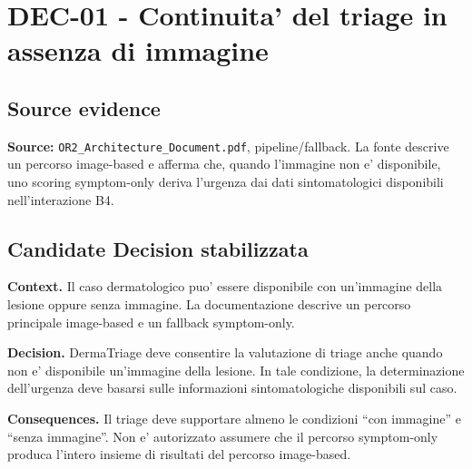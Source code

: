 \documentclass[11pt,a4paper]{article}
\begin{document}
\section{DEC-01 - Continuita' del triage in assenza di immagine}
\closedtag

\subsection{Source evidence}
\textbf{Source:} \texttt{OR2\_Architecture\_Document.pdf}, pipeline/fallback. La fonte descrive un percorso image-based e afferma che, quando l'immagine non e' disponibile, uno scoring symptom-only deriva l'urgenza dai dati sintomatologici disponibili nell'interazione B4.

\subsection{Candidate Decision stabilizzata}
\textbf{Context.} Il caso dermatologico puo' essere disponibile con un'immagine della lesione oppure senza immagine. La documentazione descrive un percorso principale image-based e un fallback symptom-only.

\textbf{Decision.} DermaTriage deve consentire la valutazione di triage anche quando non e' disponibile un'immagine della lesione. In tale condizione, la determinazione dell'urgenza deve basarsi sulle informazioni sintomatologiche disponibili sul caso.

\textbf{Consequences.} Il triage deve supportare almeno le condizioni ``con immagine'' e ``senza immagine''. Non e' autorizzato assumere che il percorso symptom-only produca l'intero insieme di risultati del percorso image-based.
\end{document}
